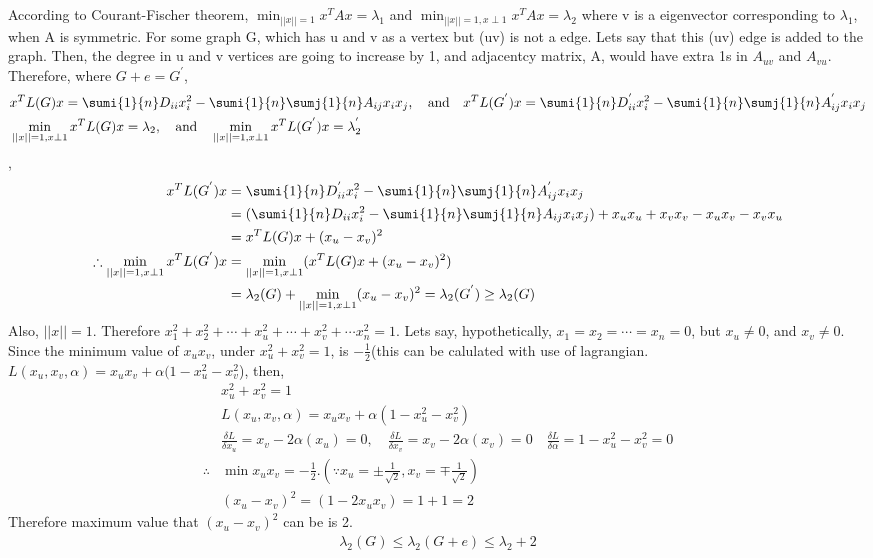 \documentclass{article}
\begin{document}
\begin{problem}
    According to Courant-Fischer theorem, $\min_{||x|| = 1} x^T A x = \lambda_1$ and $\min_{||x|| = 1, x\perp 1} x^T A x = \lambda_2$ where v is a eigenvector corresponding to $\lambda_1$, when A is symmetric. For some graph G, which has u and v as a vertex but (uv) is not a edge. Lets say that this (uv) edge is added to the graph. Then, the degree in u and v vertices are going to increase by 1, and adjacentcy matrix, A, would have extra 1s in $A_{uv}$ and $A_{vu}$. Therefore, where $G + e = G^{'}$, 
    \begin{align*}
        &x^T L(G) x = \sumi{1}{n} D_{ii} x_i^2 - \sumi{1}{n} \sumj{1}{n} A_{ij}x_i x_j 
        , \quad \textrm{and} \quad \space x^T L(G^{'}) x = \sumi{1}{n} D^{'}_{ii} x_i^2 - \sumi{1}{n} \sumj{1}{n} A^{'}_{ij}x_i x_j \\
        &\min_{||x|| = 1, x\perp 1} x^T L(G) x = \lambda_2,\quad \textrm{and} \quad \min_{||x|| = 1, x\perp 1} x^T L(G^{'}) x = \lambda_2^{'}
    \end{align*},
    \begin{align*}
        x^T L(G^{'}) x &= \sumi{1}{n} D^{'}_{ii} x_i^2 - \sumi{1}{n} \sumj{1}{n} A^{'}_{ij}x_i x_j \\
        &=(\sumi{1}{n} D_{ii} x_i^2 - \sumi{1}{n} \sumj{1}{n} A_{ij}x_i x_j) + x_u x_u + x_v x_v - x_u x_v - x_v x_u\\
        &=   x^T L(G) x + (x_u - x_v)^2\\
        \therefore  \min_{||x|| = 1, x\perp 1} x^T L(G^{'}) x &=  \min_{||x|| = 1, x\perp 1} (x^T L(G) x  + (x_u - x_v)^2) \\
        &= \lambda_2(G) + \min_{||x|| = 1, x\perp 1} (x_u - x_v)^2  = \lambda_2(G^{'})  \geq \lambda_2(G)
    \end{align*}
    Also, $||x|| = 1$. Therefore $x_1^2 + x_2^2 + \cdots +  x_u ^2 + \cdots +  x_v^2 + \cdots x_n^2 = 1 $. Lets say, hypothetically, $ x_1 = x_2 = \cdots = x_n = 0$, but $x_u \neq 0$, and $x_v \neq 0$. Since the minimum value of $x_u x_v$, under $x_u^2 + x_v^2 = 1$, is $-\frac{1}{2}$(this can be calulated with use of lagrangian. $L(x_u, x_v, \alpha) = x_u x_v + \alpha (1 - x_u^2 - x_v^2$), then, 
    \begin{align*}
        &x_u^2 + x_v^2 = 1\\
        &L(x_u, x_v, \alpha) = x_u x_v + \alpha (1 - x_u^2 - x_v^2)\\
        &\frac{\delta L}{\delta x_u} = x_v - 2 \alpha (x_u) = 0, \quad
        \frac{\delta L}{\delta x_v} = x_v - 2 \alpha (x_v) = 0 \quad
        \frac{\delta L}{\delta \alpha} = 1 - x_u^2 - x_v^2 = 0\\
        \therefore & \min{x_u x_v}  = -\frac{1}{2}. (\because x_u = \pm \frac{1}{\sqrt{2}}, x_v = \mp \frac{1}{\sqrt{2}})\\
        &(x_u - x_v)^2  = (1 - 2 x_u x_v) = 1 + 1 = 2 
    \end{align*}
    Therefore maximum value that $(x_u - x_v)^2$ can be is 2. 
    \begin{align*}
        \lambda_2 (G) \leq \lambda_2(G+e) \leq \lambda_2 + 2
    \end{align*}
\end{problem}
\end{document}
